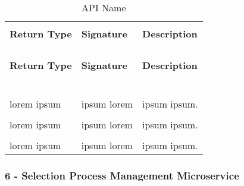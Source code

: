 \begin{longtable}{p{}p{}p{}}
    \caption{API Name}
    \vspace{0.5em}\\
    \hline
    \vspace{0.5em}\\
    \textbf{Return Type} & \textbf{Signature} & \textbf{Description} \\
    \vspace{0.5em}\\
    \hline
    \vspace{0.5em}\\
    \endfirsthead
    \vspace{0.5em}\\
    \hline
    \vspace{0.5em}\\
    \textbf{Return Type} & \textbf{Signature} & \textbf{Description} \\
    \vspace{0.5em}\\
    \hline
    \vspace{0.5em}\\
    \endhead
    
    \vspace{0.5em}\\
    \hline
    \vspace{0.5em}\\
    \endfoot
    
    \vspace{0.5em}\\
    \hline
    \vspace{0.5em}\\
    \endlastfoot
    
    lorem ipsum &
    ipsum lorem &
    ipsum ipsum. \\
    \vspace{0.5em}\\
    lorem ipsum &
    ipsum lorem &
    ipsum ipsum. \\
    \vspace{0.5em}\\
    lorem ipsum &
    ipsum lorem &
    ipsum ipsum. \\

\end{longtable}

\subsubsection{6 - Selection Process Management Microservice}

